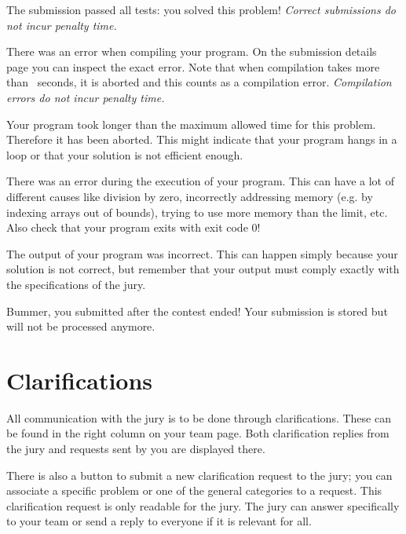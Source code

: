 \begin{description}[\setleftmargin{4.5cm}]
\item[CORRECT]
The submission passed all tests: you solved this problem!
\textit{Correct submissions do not incur penalty time.}

\item[COMPILER-ERROR]
There was an error when compiling your program. On the submission
details page you can inspect the exact error. Note that when
compilation takes more than \COMPILETIME\ seconds, it is aborted and
this counts as a compilation error.
\textit{Compilation errors do not incur penalty time.}

\item[TIMELIMIT]
Your program took longer than the maximum allowed time for this
problem. Therefore it has been aborted. This might indicate that your
program hangs in a loop or that your solution is not efficient
enough.

\item[RUN-ERROR]
There was an error during the execution of your program. This can have
a lot of different causes like division by zero, incorrectly
addressing memory (e.g. by indexing arrays out of bounds), trying to
use more memory than the limit, etc.
Also check that your program exits with exit code 0!

\item[WRONG-ANSWER]
The output of your program was incorrect. This can happen simply
because your solution is not correct, but remember that your output
must comply exactly with the specifications of the jury.

\item[TOO-LATE]
Bummer, you submitted after the contest ended! Your submission is
stored but will not be processed anymore.
\end{description}

\section{Clarifications}

All communication with the jury is to be done through clarifications.
These can be found in the right column on your team page. Both
clarification replies from the jury and requests sent by you
are displayed there.

There is also a button to submit a new clarification request to the
jury; you can associate a specific problem or one of the general
categories to a request. This clarification request is only readable
for the jury. The jury can answer specifically to your team or send a
reply to everyone if it is relevant for all.

